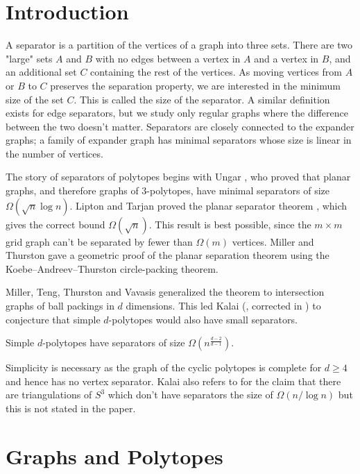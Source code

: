 \chapter{Introduction}
\label{intro}

A separator is a partition of the vertices of a graph into three sets. There are two "large" sets $A$ and $B$ with no edges
between a vertex in $A$ and a vertex in $B$, and 
an additional set $C$ containing the rest of the vertices. As moving vertices from $A$ or $B$ to
$C$ preserves the separation property, we are interested in the minimum size of the set $C$. 
This is called the size of the separator. A similar definition exists for edge separators, but we study
only regular graphs where the difference between the two doesn't matter.
Separators are closely connected to the expander graphs; a family of expander graph has minimal separators
whose size is linear in the number of vertices.



The story of separators of polytopes begins with Ungar \cite{Ungar1951},
who proved that planar graphs, and therefore graphs of 3-polytopes, have minimal 
separators of size $\Omega(\sqrt{n} \log n)$. Lipton and Tarjan proved the planar 
separator theorem  \cite{LiTa}, which gives the correct bound
$\Omega(\sqrt{n})$. This result is best possible, since the $m\times m$ grid graph
can't be separated by fewer than $\Omega(m)$ vertices. Miller and Thurston \cite{MillerThurston-separators} gave a 
geometric proof of the planar separation theorem using the  
Koebe–Andreev–Thurston circle-packing theorem.

Miller, Teng, Thurston and Vavasis \cite{MillerTengThurstonVavasis} generalized 
the theorem to intersection graphs of ball packings in $d$ dimensions. This 
led Kalai (\cite{Kal97}, corrected in \cite{kalai04:_polyt}) to conjecture that 
simple $d$-polytopes would also have small separators.
\begin{conjecture}
\label{simpleconjecture}
Simple $d$-polytopes have separators of size
$\Omega \left(n^{\frac{d-2}{d-1}}\right)$.
\end{conjecture}
Simplicity is necessary as the graph of the cyclic polytopes is complete for 
$d\geq 4$ and hence has no vertex separator. Kalai also refers to 
\cite{MillerTengThurstonVavasis} for the claim that there are triangulations of 
$S^3$ which don't have separators the size of $\Omega(n/\log n)$ but this is not 
stated in the paper. 

\chapter{Graphs and Polytopes}
\label{mathchapter}


